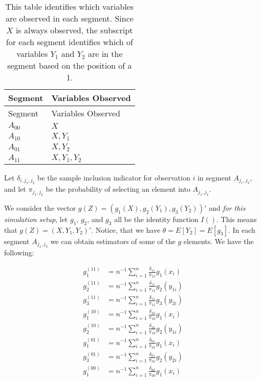 \documentclass[
  letterpaper,
  DIV=11,
  numbers=noendperiod]{scrartcl}
\begin{document}
\hypertarget{tbl-vars1}{}
\begin{longtable}[]{@{}ll@{}}
\caption{\label{tbl-vars1}This table identifies which variables are
observed in each segment. Since \(X\) is always observed, the subscript
for each segment identifies which of variables \(Y_1\) and \(Y_2\) are
in the segment based on the position of a 1.}\tabularnewline
\toprule\noalign{}
Segment & Variables Observed \\
\midrule\noalign{}
\endfirsthead
\toprule\noalign{}
Segment & Variables Observed \\
\midrule\noalign{}
\endhead
\bottomrule\noalign{}
\endlastfoot
\(A_{00}\) & \(X\) \\
\(A_{10}\) & \(X, Y_1\) \\
\(A_{01}\) & \(X, Y_2\) \\
\(A_{11}\) & \(X, Y_1, Y_2\) \\
\end{longtable}

Let \(\delta_{i, j_1, j_2}\) be the sample inclusion indicator for
observation \(i\) in segment \(A_{j_1, j_2}\), and let
\(\pi_{j_1, j_2}\) be the probability of selecting an element into
\(A_{j_1, j_2}\).

We consider the vector \(g(Z) = (g_1(X), g_2(Y_1), g_3(Y_2))'\) and
\emph{for this simulation setup}, let \(g_1\), \(g_2\), and \(g_3\) all
be the identity function \(I()\). This means that
\(g(Z) = (X, Y_1, Y_2)'\). Notice, that we have
\(\theta = E[Y_2] = E[g_3]\). In each segment \(A_{j_1, j_2}\) we can
obtain estimators of some of the \(g\) elements. We have the following:

\begin{align*}
g_1^{(11)} &= n^{-1} \sum_{i = 1}^n \frac{\delta_{11}}{\pi_{11}} g_1(x_i) \\
g_2^{(11)} &= n^{-1} \sum_{i = 1}^n \frac{\delta_{11}}{\pi_{11}} g_2(y_{1i}) \\
g_3^{(11)} &= n^{-1} \sum_{i = 1}^n \frac{\delta_{11}}{\pi_{11}} g_3(y_{2i}) \\
g_1^{(10)} &= n^{-1} \sum_{i = 1}^n \frac{\delta_{10}}{\pi_{10}} g_1(x_i) \\
g_2^{(10)} &= n^{-1} \sum_{i = 1}^n \frac{\delta_{10}}{\pi_{10}} g_2(y_{1i}) \\
g_1^{(01)} &= n^{-1} \sum_{i = 1}^n \frac{\delta_{01}}{\pi_{01}} g_1(x_i) \\
g_3^{(01)} &= n^{-1} \sum_{i = 1}^n \frac{\delta_{01}}{\pi_{01}} g_2(y_{2i}) \\
g_1^{(00)} &= n^{-1} \sum_{i = 1}^n \frac{\delta_{00}}{\pi_{00}} g_1(x_i) \\
\end{align*}
\end{document}
